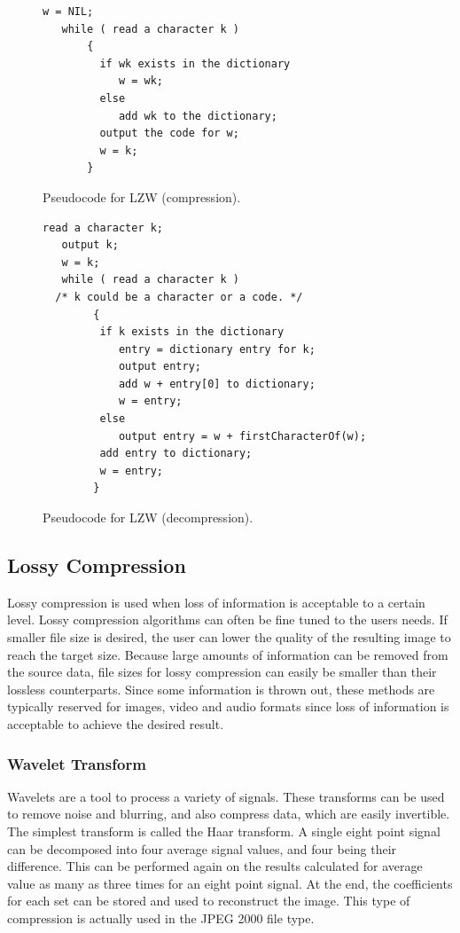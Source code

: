 \documentclass[12pt]{article}
\begin{document}
\begin{center}
\begin{figure}[!htbp]
\begin{verbatim}
w = NIL;
   while ( read a character k )
       {
         if wk exists in the dictionary
            w = wk;
         else
            add wk to the dictionary;
         output the code for w;
         w = k;
       }
\end{verbatim}
\caption{Pseudocode for LZW (compression).}
\end{figure}
\begin{figure}[!htbp]
\begin{verbatim}
read a character k;
   output k;
   w = k;
   while ( read a character k )    
  /* k could be a character or a code. */
        {
         if k exists in the dictionary
            entry = dictionary entry for k;
            output entry;
            add w + entry[0] to dictionary;
            w = entry;
         else
            output entry = w + firstCharacterOf(w);
         add entry to dictionary;
         w = entry;
        }
\end{verbatim}
\caption{Pseudocode for LZW (decompression).}
\end{figure}
\end{center}

\subsection{Lossy Compression}
Lossy compression is used when loss of information is acceptable to a certain level. Lossy compression algorithms can often be fine tuned to the users needs. If smaller file size is desired, the user can lower the quality of the resulting image to reach the target size. Because large amounts of information can be removed from the source data, file sizes for lossy compression can easily be smaller than their lossless counterparts. Since some information is thrown out, these methods are typically reserved for images, video and audio formats since loss of information is acceptable to achieve the desired result.

\subsubsection{Wavelet Transform}
Wavelets are a tool to process a variety of signals. These transforms can be used to remove noise and blurring, and also compress data, which are easily invertible. The simplest transform is called the Haar transform. A single eight point signal can be decomposed into four average signal values, and four being their difference. This can be performed again on the results calculated for average value as many as three times for an eight point signal. At the end, the coefficients for each set can be stored and used to reconstruct the image. This type of compression is actually used in the JPEG 2000 file type. \citep{Chui}
\end{document}
